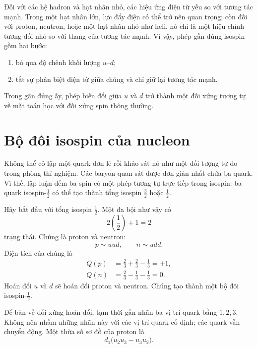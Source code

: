 Đối với các hệ hadron và hạt nhân nhỏ, các hiệu ứng điện từ yếu so với tương tác mạnh. Trong một hạt nhân lớn, lực đẩy điện có thể trở nên quan trọng; còn đối với proton, neutron, hoặc một hạt nhân nhỏ như heli, nó chỉ là một hiệu chỉnh tương đối nhỏ so với thang của tương tác mạnh. Vì vậy, phép gần đúng isospin gồm hai bước:

\begin{enumerate}
\item bỏ qua độ chênh khối lượng \(u\)--\(d\);
\item tắt sự phân biệt điện từ giữa chúng và chỉ giữ lại tương tác mạnh.
\end{enumerate}

Trong gần đúng ấy, phép biến đổi giữa \(u\) và \(d\) trở thành một đối xứng tương tự về mặt toán học với đối xứng spin thông thường.

\section{Bộ đôi isospin của nucleon}

Không thể cô lập một quark đơn lẻ rồi khảo sát nó như một đối tượng tự do trong phòng thí nghiệm. Các baryon quan sát được đơn giản nhất chứa ba quark. Vì thế, lập luận đếm ba spin có một phép tương tự trực tiếp trong isospin: ba quark isospin-\(\tfrac12\) có thể tạo thành tổng isospin \(\tfrac32\) hoặc \(\tfrac12\).

Hãy bắt đầu với tổng isospin \(\tfrac12\). Một đa bội như vậy có
\begin{equation}
2\left(\frac12\right)+1=2
\end{equation}
trạng thái. Chúng là proton và neutron:
\begin{equation}
p\sim uud,
\qquad
n\sim udd.
\end{equation}
Điện tích của chúng là
\begin{align}
Q(p)
&=\frac23+\frac23-\frac13
=+1,\\
Q(n)
&=\frac23-\frac13-\frac13
=0.
\end{align}
Hoán đổi \(u\) và \(d\) sẽ hoán đổi proton và neutron. Chúng tạo thành một bộ đôi isospin-\(\tfrac12\).

Để bàn về đối xứng hoán đổi, tạm thời gắn nhãn ba vị trí quark bằng \(1,2,3\). Không nên nhầm những nhãn này với các vị trí quark cố định; các quark vẫn chuyển động. Một thừa số sơ đồ của proton là
\begin{equation}
d_1\bigl(u_2u_3-u_3u_2\bigr).
\end{equation}

